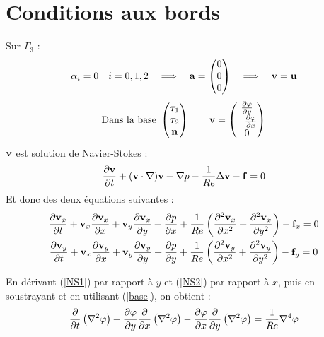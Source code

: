 \documentclass[a4paper,11pt]{article}
\begin{document}
\section{Conditions aux bords}
\label{cdtsortie}
Sur $\Gamma_3$ :
\[ \alpha_i=0\quad i=0,1,2\quad \Longrightarrow\quad {\mathbf{a}}=\begin{pmatrix}0\\0\\0\end{pmatrix}\quad \Longrightarrow\quad {\mathbf{v}}={\mathbf{u}} \]
\begin{equation}\label{base}
  \mbox{Dans la base }
  \begin{pmatrix}
    \bm{\tau}_1\\\bm{\tau}_2\\{\mathbf{n}}
  \end{pmatrix}
  \quad\quad {\mathbf{v}}=
  \begin{pmatrix}
    \frac{\partial\varphi}{\partial y}\\-\frac{\partial\varphi}{\partial x}\\0
  \end{pmatrix}
\end{equation}
${\mathbf{v}}$ est solution de Navier-Stokes :
\[ \frac{\partial{\mathbf{v}}}{\partial t} + ({\mathbf{v}}\cdot\nabla){\mathbf{v}} + {\nabla} p - \frac{1}{Re}{\Delta}{\mathbf{v}} - {\mathbf{f}} = 0 \]
Et donc des deux équations suivantes :
\begin{gather}
  \frac{\partial{\mathbf{v}}_x}{\partial t} + {\mathbf{v}}_x\frac{\partial{\mathbf{v}}_x}{\partial x} + {\mathbf{v}}_y\frac{\partial{\mathbf{v}}_x}{\partial y} + \frac{\partial p}{\partial x} + \frac{1}{Re}\left(\frac{\partial^2{\mathbf{v}}_x}{\partial x^2} + \frac{\partial^2{\mathbf{v}}_x}{\partial y^2}\right) - {\mathbf{f}}_x = 0 \label{NS1}\\
  \frac{\partial{\mathbf{v}}_y}{\partial t} + {\mathbf{v}}_x\frac{\partial{\mathbf{v}}_y}{\partial x} + {\mathbf{v}}_y\frac{\partial{\mathbf{v}}_y}{\partial y} + \frac{\partial p}{\partial y} + \frac{1}{Re}\left(\frac{\partial^2{\mathbf{v}}_y}{\partial x^2} + \frac{\partial^2{\mathbf{v}}_y}{\partial y^2}\right) - {\mathbf{f}}_y = 0 \label{NS2}
\end{gather}

En dérivant (\ref{NS1}) par rapport à $y$ et (\ref{NS2}) par rapport à $x$, puis en soustrayant et en utilisant (\ref{base}), on obtient :
\begin{equation}
  \frac{\partial}{\partial t}\left({\nabla}^2\varphi\right) + \frac{\partial\varphi}{\partial y}\frac{\partial}{\partial x}\left({\nabla}^2\varphi\right) - \frac{\partial\varphi}{\partial x}\frac{\partial}{\partial y}\left({\nabla}^2\varphi\right) = \frac{1}{Re}\nabla^4\varphi
\end{equation}
\end{document}
